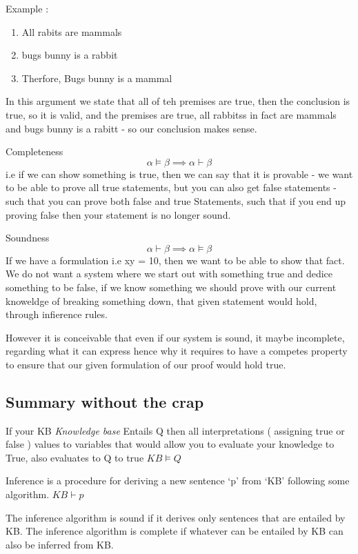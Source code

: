 \documentclass{article}
\theoremstyle{mytheoremstyle}
\theoremstyle{mytheoremstyle}
\theoremstyle{myproblemstyle}
\begin{document}
Example :

\begin{enumerate}
    \item All rabits are mammals
    \item bugs bunny is a rabbit
    \item Therfore, Bugs bunny is a mammal
\end{enumerate}
In this argument we state that all of teh premises are true, then the conclusion is true, so it is valid, and the premises are true, all rabbitss in fact are mammals and bugs bunny is a rabitt - so our conclusion makes sense.

\begin{definition}
    Completeness
    \begin{displaymath}
        \alpha \models \beta \implies \alpha \vdash \beta
    \end{displaymath}
    i.e if we can show something is true, then we can say that it is provable - we want to be able to prove all true statements, but you can also get false statements - such that you can prove both false and true Statements, such that if you end up proving false then your statement is no longer sound.
\end{definition}
\newpage

\begin{definition}
    Soundness
    \begin{displaymath}
        \alpha \vdash \beta \implies \alpha \models \beta
    \end{displaymath}
    If we have a formulation i.e xy = 10, then we want to be able to show that fact. We do not want a system where we start out with something true and dedice something to be false, if we know something we should prove with our current knoweldge of breaking something down, that given statement would hold, through infierence rules.

    However it is conceivable that even if our system is sound, it maybe incomplete, regarding what it can express hence why it requires to have a competes property to ensure that our given formulation of our proof would hold true.


\end{definition}


\subsection{Summary without the crap }
If your KB \textit{Knowledge base }Entails Q then all interpretations ( assigning true or false ) values to variables that would allow you to evaluate your knowledge to True, also evaluates to Q to true
\begin{math}
    KB \models Q
\end{math}

Inference is a procedure for deriving a new sentence ‘p’ from ‘KB’ following some algorithm.
\begin{math}
    KB \vdash p
\end{math}

The inference algorithm is sound if it derives only sentences that are entailed by KB. The inference algorithm is complete if whatever can be entailed by KB can also be inferred from KB.
\end{document}
